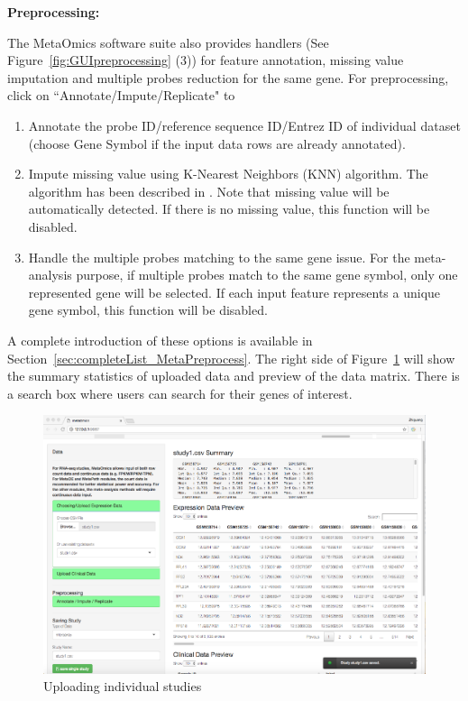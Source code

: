 \begin{steps}
\item \textbf{Preprocessing:}

The MetaOmics software suite also provides handlers (See Figure~\ref{fig:GUIpreprocessing} {\color{red} (3)}) for feature annotation, 
missing value imputation and multiple probes reduction for the same gene.
For preprocessing, 
click on ``Annotate/Impute/Replicate" to 
\begin{enumerate}
\item Annotate the probe ID/reference sequence ID/Entrez ID of individual dataset (choose Gene Symbol if the input data rows are already annotated).
\item Impute missing value using K-Nearest Neighbors (KNN) algorithm.
The algorithm has been described in \cite{troyanskaya2001missing}.
Note that missing value will be automatically detected. 
If there is no missing value, this function will be disabled.

\item Handle the multiple probes matching to the same gene issue.
For the meta-analysis purpose, 
if multiple probes match to the same gene symbol, only one represented gene will be selected.
If each input feature represents a unique gene symbol, this function will be disabled.

\end{enumerate}

A complete introduction of these options is available in Section~\ref{sec:completeList_MetaPreprocess}.
The right side of Figure~\ref{fig:GUIpreview} will show the summary statistics of uploaded data and preview of the data matrix.
There is a search box where users can search for their genes of interest.

\begin{figure}[H]
\begin{center}
\includegraphics[scale=1]{./figure/preprocessing/GUIpreview}
\caption{Uploading individual studies}
\label{fig:GUIpreview}
\end{center}
\end{figure}


\end{steps}
